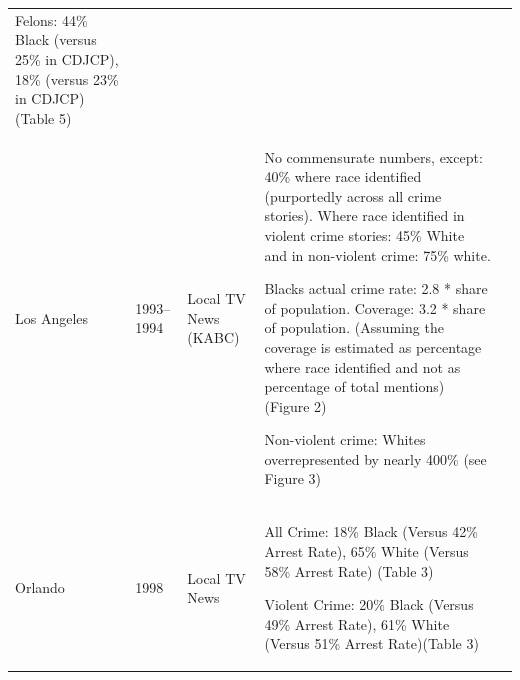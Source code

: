\begin{table}[p]
\begin{tabular}{p{.12\linewidth}p{.09\linewidth}p{.12\linewidth}p{.40\linewidth}p{.12\linewidth}}
Felons: 44\% Black (versus 25\% in CDJCP), 18\% (versus 23\% in CDJCP) (Table 5) & \citet{dixon2000overrepresentation} \\
Los Angeles & 1993--1994 & Local TV News (KABC) & No commensurate numbers, except: 40\% where race identified (purportedly across all crime stories). Where race identified in violent crime stories: 45\% White and in non-violent crime: 75\% white.

Blacks actual crime rate: 2.8 * share of population. Coverage: 3.2 * share of population. (Assuming the coverage is estimated as percentage where race identified and not as percentage of total mentions) (Figure 2)

Non-violent crime: Whites overrepresented by nearly 400\% (see Figure 3) & \citet{gilliam1996crime} \\
Orlando & 1998 & Local TV News & All Crime: 18\% Black (Versus 42\% Arrest Rate),  65\% White (Versus 58\% Arrest Rate) (Table  3)

Violent Crime: 20\% Black (Versus 49\% Arrest Rate), 61\% White (Versus 51\% Arrest Rate)(Table  3) & \citet{chiricos2002racial} \\
\bottomrule
\end{tabular}
\end{table}
